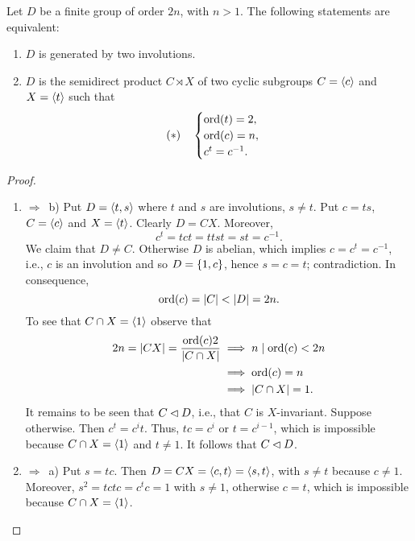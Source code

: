 \begin{thm}\label{dihedral-equivalence}
    Let\/ $D$ be a finite group of order\/ $2n$, with $n>1$. The following statements are equivalent:
    \begin{enumerate}[\rm a)]
        \item $D$ is generated by two involutions.
        \item $D$ is the semidirect product\/ $C\rtimes X$ of two cyclic subgroups\/ $C = \langle c\rangle$ and\/ $X = \langle t\rangle$ such that
        $$
        (*) \quad \begin{cases}\label{eqD}
            {\rm ord}(t) = 2,\\
            {\rm ord}(c) = n,\\
            c^t = c^{-1}.
        \end{cases}
        $$
    \end{enumerate}
\end{thm}

\begin{proof}${}$
\begin{enumerate}[\rm a)]
    \item $\Rightarrow$~b) Put $D=\langle t,s\rangle$ where $t$ and $s$ are involutions, $s\ne t$. Put $c=ts$, $C=\langle c\rangle$ and $X=\langle t\rangle$. Clearly $D=CX$. Moreover,
    $$
        c^t = tct = ttst = st = c^{-1}. 
    $$
    We claim that $D\ne C$. Otherwise $D$ is abelian, which implies $c=c^t=c^{-1}$, i.e., $c$ is an involution and so $D=\{1,c\}$, hence $s=c=t$; contradiction. In consequence,
    $$
        \ord(c)=|C|<|D|=2n.
    $$
    To see that $C\cap X=\langle1\rangle$ observe that
    \begin{align*}
        2n = |CX| = \frac{{\rm ord}(c)2}{|C\cap X|} &\implies n\mid {\rm ord}(c)<2n\\
            &\implies {\rm ord}(c)=n\\
            &\implies |C\cap X|=1.
    \end{align*}
    It remains to be seen that $C\lhd D$, i.e., that $C$ is $X$-invariant. Suppose otherwise. Then $c^t=c^it$. Thus, $tc=c^i$ or $t=c^{i-1}$, which is impossible because $C\cap X=\langle1\rangle$ and $t\ne 1$. It follows that $C\lhd D$.
    
    \item $\Rightarrow$~a) Put $s=tc$. Then $D=CX=\langle c,t\rangle=\langle s,t\rangle$, with $s\ne t$ because $c\ne 1$. Moreover, $s^2=tctc=c^tc=1$ with $s\ne1$, otherwise $c=t$, which is impossible because $C\cap X=\langle1\rangle$.
\end{enumerate}
\end{proof}

